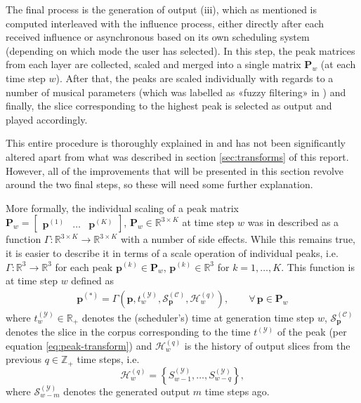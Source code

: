 The final process is the generation of output (iii), which as mentioned is computed interleaved with the influence process, either directly after each received influence or asynchronous based on its own scheduling system (depending on which mode the user has selected). In this step, the peak matrices from each layer are collected, scaled and merged into a single matrix $\bm P_w$ (at each time step $w$). After that, the peaks are scaled individually with regards to a number of musical parameters (which was labelled as «fuzzy filtering» in \cite{borg2020dynamic}) and finally, the slice corresponding to the highest peak is selected as output and played accordingly.

This entire procedure is thoroughly explained in \cite{borg2020dynamic} and has not been significantly altered apart from what was described in section \ref{sec:transforms} of this report. However, all of the improvements that will be presented in this section revolve around the two final steps, so these will need some further explanation.

More formally, the individual scaling of a peak matrix $\bm P_w = \begin{bmatrix} \bm p^{(1)} & \dots & \bm p^{(K)} \end{bmatrix}$, $\bm P_w \in \mathbb R^{3\times K}$ at time step $w$ was in \cite{borg2020dynamic} described as a function $\Gamma \colon \mathbb R^{3\times K} \rightarrow \mathbb R^{3\times K}$ with a number of side effects. While this remains true, it is easier to describe it in terms of a scale operation of individual peaks, i.e. $\Gamma \colon \mathbb R^3 \rightarrow \mathbb R^3$ for each peak $\bm p^{(k)} \in \bm P_w$, $\bm p^{(k)} \in \mathbb R^3$ for $k = 1,\dots,K$. This function is at time step $w$ defined as 
	\begin{align}
		\bm{p^{(\ast)}} =  \Gamma\left(\bm p, t^{(\mathcal Y)}_w, \mathcal S^{(\mathcal C)}_{\bm p}, \mathcal H_w^{(q)}\right), \qquad \forall\, \bm p \in \bm P_w
	\end{align}
	where $t^{(\mathcal Y)}_w \in \mathbb R_+$ denotes the (scheduler's) time at generation time step $w$, $\mathcal S^{(\mathcal C)}_{\bm p}$ denotes the slice in the corpus corresponding to the time $t^{(\mathcal Y)}$ of the peak (per equation \ref{eq:peak-transform}) and $\mathcal H_w^{(q)}$ is the history of output slices from the previous $q \in \mathbb Z_+$ time steps, i.e. 
	\begin{equation}
		\mathcal H_w^{(q)} = \left\lbrace S^{(\mathcal Y)}_{w-1},\dots,S^{(\mathcal Y)}_{w-q}\right\rbrace,
	\end{equation}
	where $\mathcal S^{(\mathcal Y)}_{w-m}$ denotes the generated output $m$ time steps ago.
	
